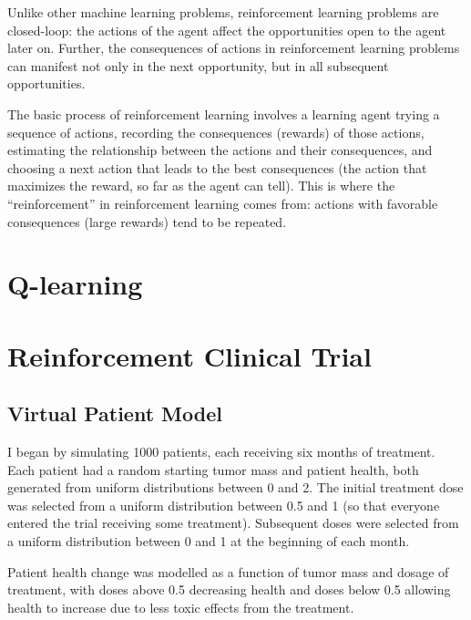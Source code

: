 \documentclass[12pt]{article}
\begin{document}
Unlike other machine learning problems, reinforcement learning problems are closed-loop: the actions of the agent affect the opportunities open to the agent later on. Further, the consequences of actions in reinforcement learning problems can manifest not only in the next opportunity, but in all subsequent opportunities.


The basic process of reinforcement learning involves a learning agent trying a sequence of actions, recording the consequences (rewards) of those actions, estimating the relationship between the actions and their consequences, and choosing a next action that leads to the best consequences (the action that maximizes the reward, so far as the agent can tell). This is where the ``reinforcement'' in reinforcement learning comes from: actions with favorable consequences (large rewards) tend to be repeated.



\section{Q-learning} %
\label{sec:q_learning}




\section{Reinforcement Clinical Trial}

\subsection{Virtual Patient Model} %
\label{sub:vpm}

I began by simulating 1000 patients, each receiving six months of treatment. Each patient had a random starting tumor mass and patient health, both generated from uniform distributions between 0 and 2. The initial treatment dose was selected from a uniform distribution between 0.5 and 1 (so that everyone entered the trial receiving some treatment). Subsequent doses were selected from a uniform distribution between 0 and 1 at the beginning of each month.

Patient health change was modelled as a function of tumor mass and dosage of treatment, with doses above 0.5 decreasing health and doses below 0.5 allowing health to increase due to less toxic effects from the treatment.
\end{document}
